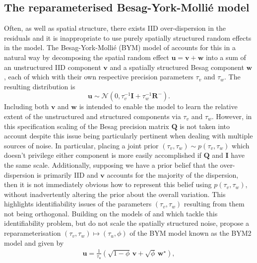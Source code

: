 \documentclass[a4paper, nobind]{templates/ociamthesis}
\begin{document}
\hypertarget{the-reparameterised-besag-york-molliuxe9-model}{%
\subsection{The reparameterised Besag-York-Mollié model}\label{the-reparameterised-besag-york-molliuxe9-model}}

Often, as well as spatial structure, there exists IID over-dispersion in the residuals and it is inappropriate to use purely spatially structured random effects in the model.
The Besag-York-Mollié (BYM) model of \textcite{besag1991bayesian} accounts for this in a natural way by decomposing the spatial random effect \(\mathbf{u} = \mathbf{v} + \mathbf{w}\) into a sum of an unstructured IID component \(\mathbf{v}\) and a spatially structured Besag component \(\mathbf{w}\), each of which with their own respective precision parameters \(\tau_v\) and \(\tau_w\).
The resulting distribution is
\begin{equation}
  \mathbf{u} \sim \mathcal{N}(0, \tau_v^{-1} \mathbf{I} + \tau_w^{-1} \mathbf{R}^{-}) \label{eq:bym}.
\end{equation}
Including both \(\mathbf{v}\) and \(\mathbf{w}\) is intended to enable the model to learn the relative extent of the unstructured and structured components via \(\tau_v\) and \(\tau_w\).
However, in this specification scaling of the Besag precision matrix \(\mathbf{Q}\) is not taken into account despite this issue being particularly pertinent when dealing with multiple sources of noise.
In particular, placing a joint prior \((\tau_v, \tau_w) \sim p(\tau_v, \tau_w)\) which doesn't privilege either component is more easily accomplished if \(\mathbf{Q}\) and \(\mathbf{I}\) have the same scale.
Additionally, supposing we have a prior belief that the over-dispersion is primarily IID and \(\mathbf{v}\) accounts for the majority of the dispersion, then it is not immediately obvious how to represent this belief using \(p(\tau_v, \tau_w)\), without inadvertently altering the prior about the overall variation.
This highlights identifiability issues of the parameters \((\tau_v, \tau_w)\) resulting from them not being orthogonal.
Building on the models of \textcite{leroux2000estimation} and \textcite{dean2001detecting} which tackle this identifiability problem, but do not scale the spatially structured noise, \textcite{simpson2017penalising} propose a reparameterisation \((\tau_v, \tau_w) \mapsto (\tau_u, \phi)\) of the BYM model known as the BYM2 model and given by
\begin{align}
  \mathbf{u} = \frac{1}{\tau_u} \left( \sqrt{1- \phi} \, \mathbf{v} + \sqrt{\phi} \, \mathbf{w}^\star \right), \label{eq:bym2}
\end{align}
\end{document}
